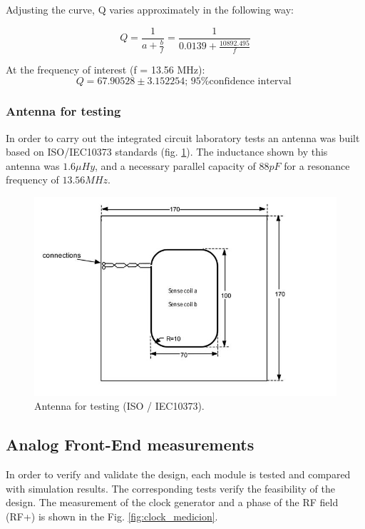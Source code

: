 \documentclass{article} %
\begin{document}
\begin{multicols}{2}
Adjusting the curve, Q varies approximately in the following way:

\begin{equation} \label{eq:vref}
 Q = \frac{1}{a + \frac{b}{f}} = \frac{1}{0.0139 + \frac{10892.495}{f}} 
\end{equation}


At the frequency of interest (f = 13.56 MHz):
$$Q = 67.90528 \pm 3.152254 \textrm{; 95\% confidence interval } $$ 

\subsubsection{ Antenna for testing}
In order to carry out the integrated circuit laboratory tests an antenna was built based on ISO/IEC10373 \cite{c7} standards  (fig. \ref{fig:L_test}).
The inductance shown by this antenna was $1.6 \mu Hy$, and a necessary parallel capacity of $88 pF$ for a resonance frequency of 
$13.56 MHz$.


\begin{figure}[H]
\centering
\includegraphics[scale=0.45]{Images/ImagenesTesina/antena/Bobina_Testing.JPG}
\caption{Antenna for testing (ISO / IEC10373).}
\label{fig:L_test}
\end{figure}




\subsection{Analog Front-End measurements}
In order to verify and validate the design, each module
is tested and compared with simulation results. The
corresponding tests verify the feasibility of the design.
The measurement of the clock generator and a phase of
the RF field (RF+) is shown in the Fig. \ref{fig:clock_medicion}. 


\end{multicols}
\end{document}
